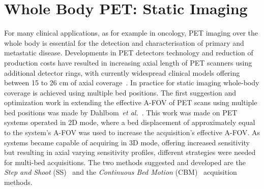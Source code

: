 \section{Whole Body PET: Static Imaging}
For many clinical applications, as for example in oncology, PET imaging over the whole body is essential for the detection and characterisation of primary and metastatic disease. Developments in PET detectors technology and reduction of production costs have resulted in increasing axial length of PET scanners using additional detector rings, with currently widespread clinical models offering between 15 to 26 cm of axial coverage~\cite{Vandenberghe2020}.
In practice for static imaging whole-body coverage is achieved using multiple bed positions. The first suggestion and optimization work in extending the effective A-FOV of PET scans using multiple bed positions was made by Dahlbom~\textit{et al.}~\cite{Dahlbom1992}. This work was made on PET systems operated in 2D mode, where a bed displacement of approximately equal to the system's A-FOV was used to increase the acquisition's effective A-FOV. As systems became capable of acquiring in 3D mode, offering increased sensitivity but resulting in axial varying sensitivity profiles, different strategies were needed for multi-bed acquisitions. The two methods suggested and developed are the \textit{Step and Shoot} (SS)~\cite{Schubert1996} and the \textit{Continuous Bed Motion} (CBM)~\cite{Panin2014} acquisition methods.

